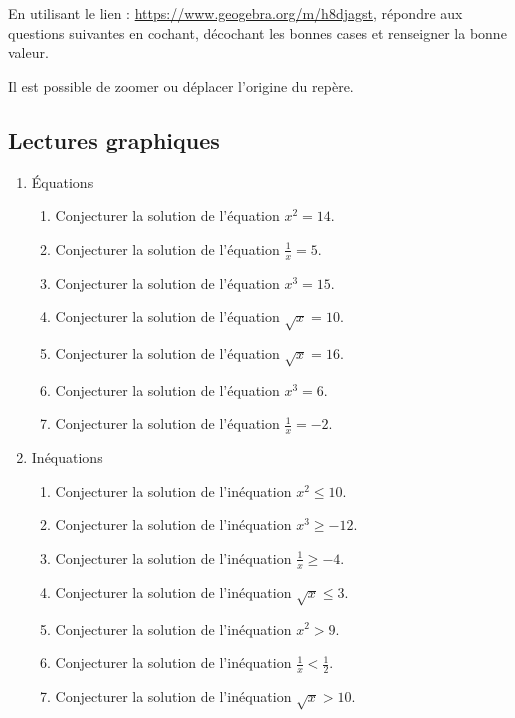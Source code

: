 \documentclass[10pt]{article}
\begin{document}
 


En utilisant le lien : \url{https://www.geogebra.org/m/h8djagst}, répondre aux questions suivantes en cochant, décochant les bonnes cases  et renseigner la bonne valeur. 

Il est possible de zoomer ou déplacer l'origine du repère.
 
\subsection*{Lectures graphiques} 

\begin{enumerate}
\item Équations
\begin{enumerate}
\item Conjecturer la solution de l'équation $x^2=14$. 
\item Conjecturer la solution de l'équation $\frac{1}{x}=5$.  
\item Conjecturer la solution de l'équation $x^3=15$.   
\item Conjecturer la solution de l'équation $\sqrt{x}=10$.   
\item Conjecturer la solution de l'équation $\sqrt{x}=16$.  
\item Conjecturer la solution de l'équation $x^3=6$. 
\item Conjecturer la solution de l'équation $\frac{1}{x}=-2$.  
\end{enumerate}
\item Inéquations
\begin{enumerate}
\item Conjecturer la solution de l'inéquation $x^2 \leq 10$. 
\item Conjecturer la solution de l'inéquation $x^3 \geq -12$.   
\item Conjecturer la solution de l'inéquation $\frac{1}{x} \geq -4$.  
\item Conjecturer la solution de l'inéquation $\sqrt{x}\leq 3$.  
\item Conjecturer la solution de l'inéquation $x^2 > 9$.  
\item Conjecturer la solution de l'inéquation $\frac{1}{x}<\frac{1}{2}$.   
\item Conjecturer la solution de l'inéquation $\sqrt{x}> 10$.   
\end{enumerate} 
\end{enumerate}
 
 
\end{document}
